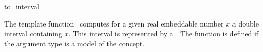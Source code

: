 \begin{ccRefFunction}{to_interval}

\ccDefinition

The template function \ccRefName\ computes for a given real embeddable 
number $x$ a double interval containing $x$. 
This interval is represented by a . 
The function is defined if the argument type 
is a model of the  concept. 


{}

\ccSeeAlso

\\
\\

\end{ccRefFunction}
